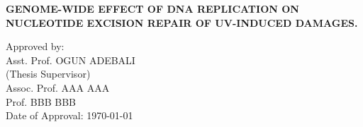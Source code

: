 \clearpage\pagebreak
\thispagestyle{empty} 
\onehalfspacing

\begin{tightcenter} 
\MakeUppercase{\textbf{GENOME-WIDE EFFECT OF DNA REPLICATION ON
NUCLEOTIDE EXCISION REPAIR OF UV-INDUCED
DAMAGES.}}
\end{tightcenter}

\vspace{3\baselineskip}

Approved by:\\[3\baselineskip]
\setlength\parindent{1.25cm}
Asst. Prof. OGUN ADEBALI \dotfill \\
\indent (Thesis Supervisor) \\[2\baselineskip]
Assoc. Prof. AAA AAA \dotfill \\[3\baselineskip]
Prof. BBB BBB \dotfill \\[3\baselineskip]
\setlength\parindent{0cm}
Date of Approval: \usdate\today

\clearpage\pagebreak
\thispagestyle{plain}